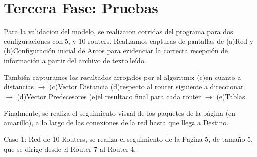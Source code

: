\documentclass[12pt]{article} %
\begin{document}
\section{Tercera Fase: Pruebas}
Para la validacion del modelo, se realizaron corridas del programa para dos configuraciones con 5,  y 10 routers.
Realizamos capturas de pantallas de (a)Red y (b)Configuración inicial de Arcos para evidenciar la correcta recepción de información a partir del archivo de texto leído.

También capturamos los resultados arrojados por el algoritmo:
(c)en cuanto a distancias $\rightarrow$ (c)Vector Distancia
(d)respecto al router siguiente a direccionar $\rightarrow$ (d)Vector Predecesores
(e)el resultado final para cada router $\rightarrow$ (e)Tablas.

Finalmente, se realiza el seguimiento visual de los paquetes de la página (en amarillo), a lo largo de las conexiones de la red hasta que llega a Destino.

Caso 1: Red de 10 Routers, se realiza el seguimiento de la Pagina 5, de tamaño 5, que se dirige desde el Router 7 al Router 4.

\begin{figure}[H] %
\label{fig:config_1_A}
\end{figure}
\end{document}
